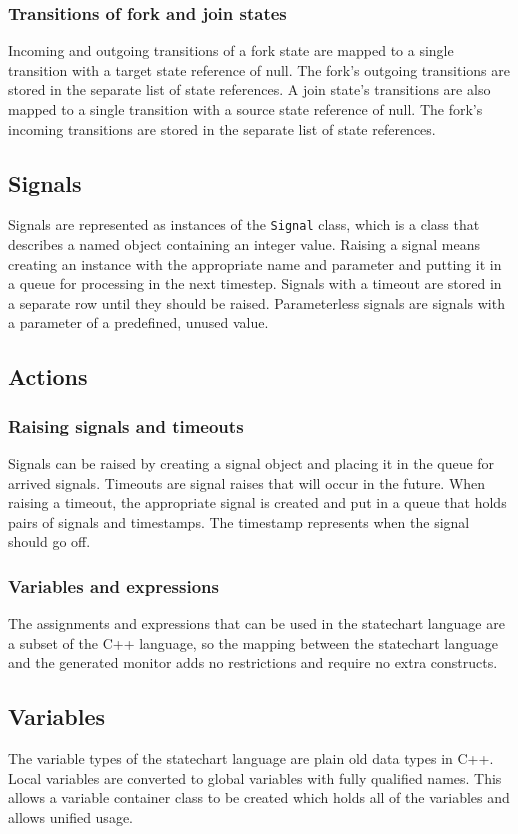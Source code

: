     \subsubsection{Transitions of fork and join states}
Incoming and outgoing transitions of a fork state are mapped to a single transition with a target state reference of null. The fork's outgoing transitions are stored in the separate list of state references. A join state's transitions are also mapped to a single transition with a source state reference of null. The fork's incoming transitions are stored in the separate list of state references.
  \subsection{Signals}
Signals are represented as instances of the \verb!Signal! class, which is a class that describes a named object containing an integer value. Raising a signal means creating an instance with the appropriate name and parameter and putting it in a queue for processing in the next timestep. Signals with a timeout are stored in a separate row until they should be raised. Parameterless signals are signals with a parameter of a predefined, unused value.
  \subsection{Actions}
    \subsubsection{Raising signals and timeouts}
Signals can be raised by creating a signal object and placing it in the queue for arrived signals. Timeouts are signal raises that will occur in the future. When raising a timeout, the appropriate signal is created and put in a queue that holds pairs of signals and timestamps. The timestamp represents when the signal should go off.
    \subsubsection{Variables and expressions}
The assignments and expressions that can be used in the statechart language are a subset of the C++ language, so the mapping between the statechart language and the generated monitor adds no restrictions and require no extra constructs.
  \subsection{Variables}
The variable types of the statechart language are plain old data types in C++. Local variables are converted to global variables with fully qualified names. This allows a variable container class to be created which holds all of the variables and allows unified usage.
